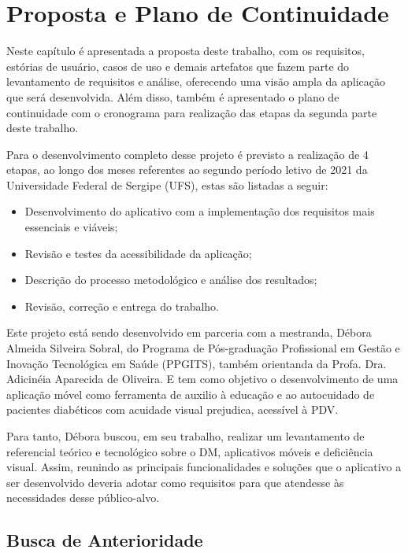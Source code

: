 \chapter{Proposta e Plano de Continuidade}

Neste capítulo é apresentada a proposta deste trabalho, com os requisitos, estórias de usuário, casos de uso e demais artefatos
que fazem parte do levantamento de requisitos e análise, oferecendo uma visão ampla da aplicação que será desenvolvida.
Além disso, também é apresentado o plano de continuidade com o cronograma para realização das etapas da segunda parte deste
trabalho.

Para o desenvolvimento completo desse projeto é previsto a realização de 4 etapas, ao longo dos meses referentes ao segundo
período letivo de 2021 da Universidade Federal de Sergipe (UFS), estas são listadas a seguir:
\begin{itemize}
    \item Desenvolvimento do aplicativo com a implementação dos requisitos mais essenciais e viáveis;
    \item Revisão e testes da acessibilidade da aplicação;
    \item Descrição do processo metodológico e análise dos resultados;
    \item Revisão, correção e entrega do trabalho.
\end{itemize}

Este projeto está sendo desenvolvido em parceria com a mestranda, Débora Almeida Silveira Sobral, do
Programa de Pós-graduação Profissional em Gestão e Inovação Tecnológica em Saúde (PPGITS), também orientanda da Profa.
Dra. Adicinéia Aparecida de Oliveira. E tem como objetivo
o desenvolvimento de uma aplicação móvel como ferramenta de auxilio à educação e ao autocuidado de pacientes diabéticos
com acuidade visual prejudica, acessível à PDV\@.

Para tanto, Débora buscou, em seu trabalho, realizar um levantamento de referencial teórico e tecnológico sobre o DM,
aplicativos móveis e deficiência visual. Assim, reunindo as principais funcionalidades e soluções que o aplicativo a ser
desenvolvido deveria adotar como requisitos para que atendesse às necessidades desse público-alvo.

\newpage

\section{Busca de Anterioridade}

